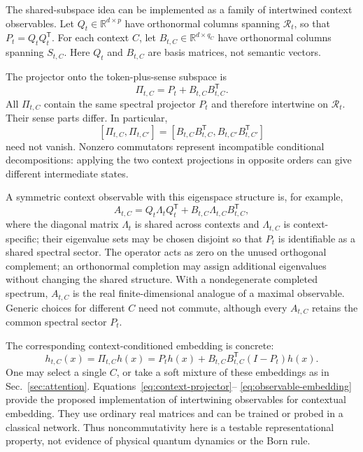 \documentclass[
  aps,
  reprint,
  superscriptaddress,
  floatfix,
  nofootinbib,
  longbibliography
]{revtex4-2}
\newcommand{\R}{\mathbb{R}}
\newcommand{\T}{^{\mathsf{T}}}
\begin{document}
The shared-subspace idea can be implemented as a family of intertwined
context observables.  Let $Q_t\in\R^{d\times p}$ have orthonormal columns
spanning $\mathcal R_t$, so that $P_t=Q_tQ_t\T$.  For each context $C$, let
$B_{t,C}\in\R^{d\times q_C}$ have orthonormal columns spanning $S_{t,C}$.
Here $Q_t$ and $B_{t,C}$ are basis matrices, not semantic vectors.

The projector onto the token-plus-sense subspace is
%
\begin{equation}
\label{eq:context-projector}
\Pi_{t,C}=P_t+B_{t,C}B_{t,C}\T .
\end{equation}
%
All $\Pi_{t,C}$ contain the same spectral projector $P_t$ and therefore
intertwine on $\mathcal R_t$.  Their sense parts differ.  In particular,
%
\begin{equation}
\label{eq:projector-commutator}
[\Pi_{t,C},\Pi_{t,C'}]
=
[B_{t,C}B_{t,C}\T,B_{t,C'}B_{t,C'}\T]
\end{equation}
%
need not vanish.  Nonzero commutators represent incompatible conditional
decompositions: applying the two context projections in opposite orders can
give different intermediate states.

A symmetric context observable with this eigenspace structure is, for
example,
%
\begin{equation}
\label{eq:context-observable}
A_{t,C}
=Q_t\Lambda_tQ_t\T
 +B_{t,C}\Lambda_{t,C}B_{t,C}\T,
\end{equation}
%
where the diagonal matrix $\Lambda_t$ is shared across contexts and
$\Lambda_{t,C}$ is context-specific; their eigenvalue sets may be chosen
disjoint so that $P_t$ is identifiable as a shared spectral sector.  The operator acts as zero on the
unused orthogonal complement; an orthonormal completion may assign additional
eigenvalues without changing the shared structure.  With a nondegenerate
completed spectrum, $A_{t,C}$ is the real finite-dimensional analogue of a
maximal observable.  Generic choices for different $C$ need not commute,
although every $A_{t,C}$ retains the common spectral sector $P_t$.

The corresponding context-conditioned embedding is concrete:
%
\begin{equation}
\label{eq:observable-embedding}
h_{t,C}(x)
=\Pi_{t,C}h(x)
=P_t h(x)+B_{t,C}B_{t,C}\T(I-P_t)h(x).
\end{equation}
%
One may select a single $C$, or take a soft mixture of these embeddings as in
Sec.~\ref{sec:attention}.  Equations~\eqref{eq:context-projector}--
\eqref{eq:observable-embedding} provide the proposed implementation of
intertwining observables for contextual embedding.  They use ordinary real
matrices and can be trained or probed in a classical network.  Thus
noncommutativity here is a testable representational property, not evidence of
physical quantum dynamics or the Born rule.
\end{document}
